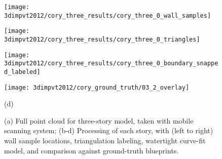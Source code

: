 \documentclass[12pt,onecolumn,oneside]{book}
\begin{document}
\begin{figure}[t]
\begin{minipage}[b]{0.24\linewidth}
  \centering
  \centerline{\texttt{[image: 3dimpvt2012/cory\_three\_results/cory\_three\_0\_wall\_samples]}}
\end{minipage}
\hfill
\begin{minipage}[b]{0.24\linewidth}
  \centering
  \centerline{\texttt{[image: 3dimpvt2012/cory\_three\_results/cory\_three\_0\_triangles]}}
\end{minipage}
\hfill
\begin{minipage}[b]{0.24\linewidth}
  \centering
  \centerline{\texttt{[image: 3dimpvt2012/cory\_three\_results/cory\_three\_0\_boundary\_snapped\_labeled]}}
\end{minipage}
\hfill
\begin{minipage}[b]{0.24\linewidth}
  \centering
  \centerline{\texttt{[image: 3dimpvt2012/cory\_ground\_truth/03\_2\_overlay]}}
\end{minipage}
\centerline{(d)}
\linebreak

\caption[Example floor plan on three-story building.]{(a) Full point cloud for three-story model, taken with mobile scanning system; (b-d) Processing of each story, with (left to right) wall sample locations, triangulation labeling, watertight curve-fit model, and comparison against ground-truth blueprints.}
\label{fig:cory_three_results}

\end{figure}

\end{document}
